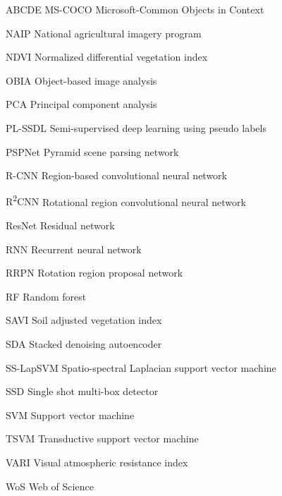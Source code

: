 \begin{seznamzkratek}{ABCDE}
	      {MS-COCO}
	      {Microsoft-Common Objects in Context}

	      {NAIP}
	      {National agricultural imagery program}

	      {NDVI}
	      {Normalized differential vegetation index}

	      {OBIA}
	      {Object-based image analysis}

	      {PCA}
	      {Principal component analysis}

	      {PL-SSDL}
	      {Semi-supervised deep learning using pseudo labels}

	      {PSPNet}
	      {Pyramid scene parsing network}

	      {R-CNN}
	      {Region-based convolutional neural network}

	      {R\textsuperscript{2}CNN}
	      {Rotational region convolutional neural network}

	      {ResNet}
	      {Residual network}

	      {RNN}
	      {Recurrent neural network}

	      {RRPN}
	      {Rotation region proposal network}

	      {RF}
	      {Random forest}

	      {SAVI}
	      {Soil adjusted vegetation index}

	      {SDA}
	      {Stacked denoising autoencoder}

	      {SS-LapSVM}
	      {Spatio-spectral Laplacian support vector machine}

	      {SSD}
	      {Single shot multi-box detector}

	      {SVM}
	      {Support vector machine}

	      {TSVM}
	      {Transductive support vector machine}

	      {VARI}
	      {Visual atmospheric resistance index}

	      {WoS}
	      {Web of Science}
	      
\end{seznamzkratek}